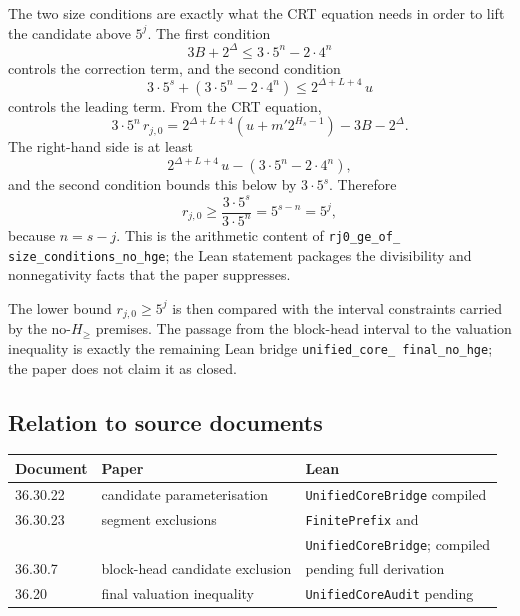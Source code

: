 The two size conditions are exactly what the CRT equation needs in
order to lift the candidate above $5^j$.  The first condition
\begin{equation*}
  3B+2^{\Delta}\le3\cdot5^n-2\cdot4^n
\end{equation*}
controls the correction term, and the second condition
\begin{equation*}
  3\cdot5^s+\left(3\cdot5^n-2\cdot4^n\right)
    \le2^{\Delta+L+4}\,u
\end{equation*}
controls the leading term.  From the CRT equation,
\begin{equation*}
  3\cdot5^n\,r_{j,0}
    =2^{\Delta+L+4}\left(u+m'2^{H_s-1}\right)-3B-2^{\Delta}.
\end{equation*}
The right-hand side is at least
\begin{equation*}
  2^{\Delta+L+4}\,u-\left(3\cdot5^n-2\cdot4^n\right),
\end{equation*}
and the second condition bounds this below by $3\cdot5^s$.  Therefore
\begin{equation*}
  r_{j,0}\ge\frac{3\cdot5^s}{3\cdot5^n}=5^{s-n}=5^j,
\end{equation*}
because $n=s-j$.  This is the arithmetic content of
\texttt{rj0\_\allowbreak ge\_\allowbreak of\_\allowbreak
size\_\allowbreak conditions\_\allowbreak no\_\allowbreak hge}; the Lean
statement packages the divisibility and nonnegativity facts that the
paper suppresses.

The lower bound $r_{j,0}\ge5^j$ is then compared with the interval
constraints carried by the no-$H_{\ge}$ premises.  The passage from
the block-head interval to the valuation inequality is exactly the
remaining Lean bridge \texttt{unified\_\allowbreak core\_\allowbreak
final\_\allowbreak no\_\allowbreak hge}; the paper does not claim it as
closed.

\subsection{Relation to source documents}

\begin{center}
\small
\begin{tabular}{@{}p{}p{}p{}@{}}
\toprule
Document & Paper & Lean \\
\midrule
36.30.22 & candidate parameterisation & \texttt{UnifiedCoreBridge} compiled \\
36.30.23 & segment exclusions & \texttt{FinitePrefix} and \\
         &                      & \texttt{UnifiedCoreBridge}; compiled \\
36.30.7 & block-head candidate exclusion & pending full derivation \\
36.20 & final valuation inequality & \texttt{UnifiedCoreAudit} pending \\
\bottomrule
\end{tabular}
\end{center}

